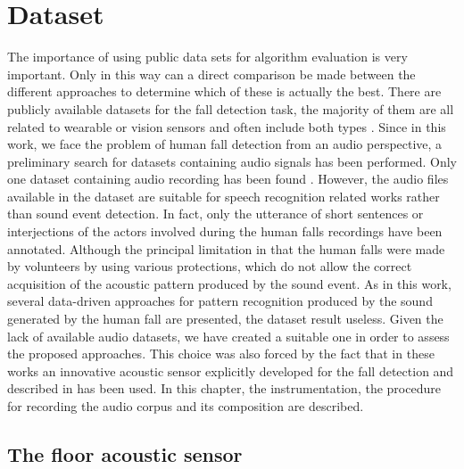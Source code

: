 \chapter{Dataset}
\label{ch:dataset}

The importance of using public data sets for algorithm evaluation is very important. Only in this way can a direct comparison be made between the different approaches to determine which of these is actually the best. There are publicly available datasets for the fall detection task, the majority of them are all related to wearable or vision sensors and often include both types \cite{spinsantefalldata, kwolek2014human, charfi2013optimized, s140610691, s17071513}.  Since in this work, we face the problem of human fall detection from an audio perspective, a preliminary search for datasets containing audio signals has been performed. Only one dataset containing audio recording has been found \cite{cirdodataset}. However, the audio files available in the dataset are suitable for speech recognition related works rather than sound event detection. In fact, only the utterance of short sentences or interjections of the actors involved during the human falls recordings have been annotated.   Although the principal limitation in that the human falls were made by volunteers by using various protections, which do not allow the correct acquisition of the acoustic pattern produced by the sound event.  As in this work, several data-driven approaches for pattern recognition produced by the sound generated by the human fall are presented, the dataset \cite{cirdodataset} result useless. Given the lack of available audio datasets, we have created a suitable one in order to assess the proposed approaches. This choice was also forced by the fact that in these works an innovative acoustic sensor explicitly developed for the fall detection and described in  has been used.
In this chapter, the instrumentation, the procedure for recording the audio corpus and its composition are described.

\section{The floor acoustic sensor}
\label{sec:sensor}

